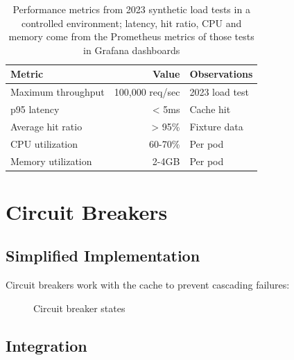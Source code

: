 \documentclass[11pt,a4paper]{article}
\begin{document}
\begin{table}[htbp]
\centering
\begin{tabular}{@{}lrl@{}}
\toprule
Metric & Value & Observations \\
\midrule
Maximum throughput & 100,000 req/sec & 2023 load test \\
p95 latency & < 5ms & Cache hit \\
Average hit ratio & > 95\% & Fixture data \\
CPU utilization & 60-70\% & Per pod \\
Memory utilization & 2-4GB & Per pod \\
\bottomrule
\end{tabular}
\caption{Performance metrics from 2023 synthetic load tests in a controlled environment; latency, hit ratio, CPU and memory come from the Prometheus metrics of those tests in Grafana dashboards}
\end{table}

\section{Circuit Breakers}

\subsection{Simplified Implementation}

Circuit breakers work with the cache to prevent cascading failures:

\begin{figure}[htbp]
\centering
{}
\caption{Circuit breaker states}
\end{figure}

\subsection{Integration}
\end{document}
